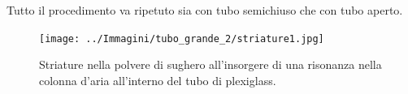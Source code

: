 \documentclass[a4paper,10pt,oneside]{article}
\begin{document}
Tutto il procedimento va ripetuto sia con tubo semichiuso che con tubo aperto.
\begin{figure}[H]
 \centering
 \texttt{[image: ../Immagini/tubo\_grande\_2/striature1.jpg]}
 \caption{Striature nella polvere di sughero all'insorgere di una risonanza nella colonna d'aria all'interno del tubo di plexiglass.}
 \label{fig:striature1}
\end{figure}
\end{document}
